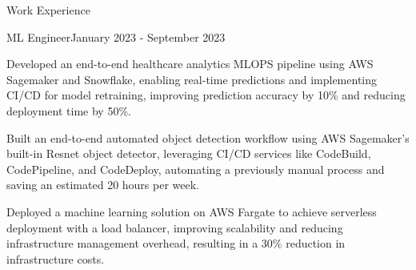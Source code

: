 \documentclass{resume} %
\begin{document}
\begin{rSection}{Work Experience}
\begin{rSubsection}
                            \end{rSubsection}
                    \begin{rSubsection}
                {ML Engineer}{January 2023 - September 2023}
                                    {}
                                {}
                                    \item Developed an end{-}to{-}end healthcare analytics MLOPS pipeline using AWS Sagemaker and Snowflake, enabling real{-}time predictions and implementing CI/CD for model retraining, improving prediction accuracy by 10\% and reducing deployment time by 50\%.
                                    \item Built an end{-}to{-}end automated object detection workflow using AWS Sagemaker's built{-}in Resnet object detector, leveraging CI/CD services like CodeBuild, CodePipeline, and CodeDeploy, automating a previously manual process and saving an estimated 20 hours per week.
                                    \item Deployed a machine learning solution on AWS Fargate to achieve serverless deployment with a load balancer, improving scalability and reducing infrastructure management overhead, resulting in a 30\% reduction in infrastructure costs.
                            \end{rSubsection}
            \end{rSection}
\end{document}

